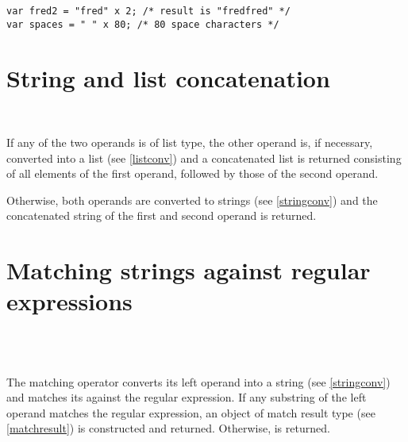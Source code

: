 \begin{lstlisting}
var fred2 = "fred" x 2; /* result is "fredfred" */
var spaces = " " x 80; /* 80 space characters */
\end{lstlisting}

\section{String and list concatenation}

\begin{grammar}
      \produces {} \\
      \produces {}
         \lextoken{\&} 
\end{grammar}

\noindent
If any of the two operands is of list type, the other operand is, if
necessary, converted into a list (see \ref{listconv}) and a
concatenated list is returned consisting of all elements of the
first operand, followed by those of the second operand.

Otherwise, both operands are converted to strings (see \ref{stringconv})
and the concatenated string of the first and second operand is returned.

\section{Matching strings against regular expressions}

\begin{grammar}
      \produces {} \\
      \produces {}
         \lextoken{=\tildeSY}  \\
      \produces {}
         \lextoken{=\tildeSY} 
\end{grammar}

\noindent
The matching operator converts its left operand into a string
(see \ref{stringconv}) and matches its against the regular
expression. If any substring of the
left operand matches the regular expression, an object of match
result type (see \ref{matchresult})
is constructed and returned. Otherwise,  is returned.

